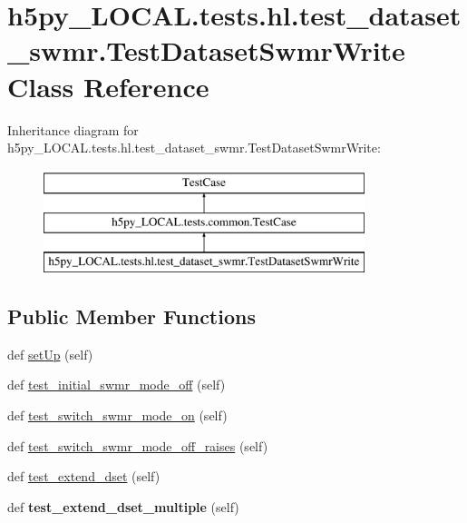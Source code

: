 \hypertarget{classh5py__LOCAL_1_1tests_1_1hl_1_1test__dataset__swmr_1_1TestDatasetSwmrWrite}{}\section{h5py\+\_\+\+L\+O\+C\+A\+L.\+tests.\+hl.\+test\+\_\+dataset\+\_\+swmr.\+Test\+Dataset\+Swmr\+Write Class Reference}
\label{classh5py__LOCAL_1_1tests_1_1hl_1_1test__dataset__swmr_1_1TestDatasetSwmrWrite}
Inheritance diagram for h5py\+\_\+\+L\+O\+C\+A\+L.\+tests.\+hl.\+test\+\_\+dataset\+\_\+swmr.\+Test\+Dataset\+Swmr\+Write\+:\begin{figure}[H]
\begin{center}
\leavevmode
\includegraphics[height=3.000000cm]{classh5py__LOCAL_1_1tests_1_1hl_1_1test__dataset__swmr_1_1TestDatasetSwmrWrite}
\end{center}
\end{figure}
\subsection*{Public Member Functions}
\begin{DoxyCompactItemize}
\item 
def \hyperlink{classh5py__LOCAL_1_1tests_1_1hl_1_1test__dataset__swmr_1_1TestDatasetSwmrWrite_a2ce0da579ee36603af2c4e194372b9c1}{set\+Up} (self)
\item 
def \hyperlink{classh5py__LOCAL_1_1tests_1_1hl_1_1test__dataset__swmr_1_1TestDatasetSwmrWrite_abb5a1808b1ad289985175de55d12c6f4}{test\+\_\+initial\+\_\+swmr\+\_\+mode\+\_\+off} (self)
\item 
def \hyperlink{classh5py__LOCAL_1_1tests_1_1hl_1_1test__dataset__swmr_1_1TestDatasetSwmrWrite_acf709a8fa723fe9c36faa5a628f3a0bf}{test\+\_\+switch\+\_\+swmr\+\_\+mode\+\_\+on} (self)
\item 
def \hyperlink{classh5py__LOCAL_1_1tests_1_1hl_1_1test__dataset__swmr_1_1TestDatasetSwmrWrite_a75e299c3e411f06471c353f6f8e89ef0}{test\+\_\+switch\+\_\+swmr\+\_\+mode\+\_\+off\+\_\+raises} (self)
\item 
def \hyperlink{classh5py__LOCAL_1_1tests_1_1hl_1_1test__dataset__swmr_1_1TestDatasetSwmrWrite_a9a723b604753cd55a8bf6a3869112d7a}{test\+\_\+extend\+\_\+dset} (self)
\item 
\mbox{\label{classh5py__LOCAL_1_1tests_1_1hl_1_1test__dataset__swmr_1_1TestDatasetSwmrWrite_a419722d14be6b066c2ad002d5668e3f8}} 
def {\bfseries test\+\_\+extend\+\_\+dset\+\_\+multiple} (self)
\end{DoxyCompactItemize}
